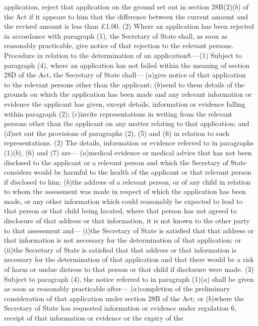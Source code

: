 \documentclass[a4paper]{article}
\begin{document}
application, reject that application on the ground set out in section 28B(2)($b$)
of the Act if it appears to him that the difference between the current amount
and the revised amount is less than £1.00.
(2) Where an application has been rejected in accordance with paragraph (1), the
Secretary of State shall, as soon as reasonably practicable, give notice of that
rejection to the relevant persons.
Procedure in relation to the determination of an application8.—(1) Subject to
paragraph (4), where an application has not failed within the meaning of section
28D of the Act, the Secretary of State shall—
($a$)give notice of that application to the relevant persons other than the
applicant;
($b$)send to them details of the grounds on which the application has been made
and any relevant information or evidence the applicant has given, except
details, information or evidence falling within paragraph (2);
($c$)invite representations in writing from the relevant persons other than the
applicant on any matter relating to that application; and
(d)set out the provisions of paragraphs (2), (5) and (6) in relation to such
representations.
(2) The details, information or evidence referred to in paragraphs (1)($b$), (6)
and (7) are—
($a$)medical evidence or medical advice that has not been disclosed to the
applicant or a relevant person and which the Secretary of State considers would
be harmful to the health of the applicant or that relevant person if disclosed
to him;
($b$)the address of a relevant person, or of any child in relation to whom the
assessment was made in respect of which the application has been made, or any
other information which could reasonably be expected to lead to that person or
that child being located, where that person has not agreed to disclosure of that
address or that information, it is not known to the other party to that
assessment and—
(i)the Secretary of State is satisfied that that address or that information is
not necessary for the determination of that application; or
(ii)the Secretary of State is satisfied that that address or that information is
necessary for the determination of that application and that there would be a
risk of harm or undue distress to that person or that child if disclosure were
made.
(3) Subject to paragraph (4), the notice referred to in paragraph (1)($a$) shall
be given as soon as reasonably practicable after—
($a$)completion of the preliminary consideration of that application under section
28B of the Act; or
($b$)where the Secretary of State has requested information or evidence under
regulation 6, receipt of that information or evidence or the expiry of the
\end{document}
